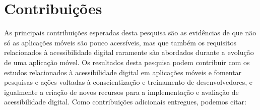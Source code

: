 
\begin{table}[!htb]
	\centering
	\caption{Cronograma - tabela teste apenas - versão 2}
	\label{tab:cronograma}
\end{table}


\section{Contribuições}
As principais contribuições esperadas desta pesquisa são as evidências de que não só as aplicações móveis são pouco acessíveis, mas que também os requisitos relacionados à acessibilidade digital raramente são abordados durante a evolução de uma aplicação móvel.
Os resultados desta pesquisa podem contribuir com os estudos relacionados à acessibilidade digital em aplicações móveis e fomentar pesquisas e ações voltadas à conscientização e treinamento de desenvolvedores, e igualmente a criação de novos recursos para
a implementação e avaliação de acessibilidade digital.
Como contribuições adicionais entregues, podemos citar:

